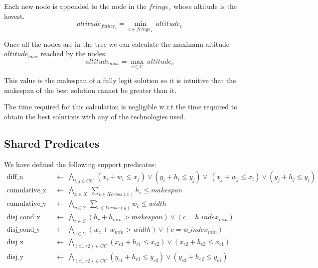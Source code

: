         Each new node is appended to the node in the \(fringe_z\) whose altitude is the lowest.
        \begin{equation*}
            altitude_{father_z} = \min_{c \in fringe_z}\ {altitude_c} 
        \end{equation*}

        Once all the nodes are in the tree we can calculate the maximum altitude $altitude_{max}$ reached by the nodes.
        \begin{equation*}
            altitude_{max} = \max_{c \in C}\  altitude_c
        \end{equation*}

        This value is the makespan of a fully legit solution so it is intuitive that the makespan of the best solution cannot
        be greater than it.
        
        The time required for this calculation is negligible w.r.t the time required to obtain the best solutions with any 
        of the technologies used.



\subsection{Shared Predicates} \label{sec:shared_predicates}
    We have defined the following support predicates:
    \begin{align}
              \text{diff\_n}\ &\ \leftarrow\ \bigwedge_{i,j \in CC}\ (x_i + w_i \leq x_j) \lor (y_i + h_i \leq y_j) \lor\ (x_j + w_j \leq x_i) \lor (y_j + h_j \leq y_i) \label{eq:diffn}        \\
        \text{cumulative\_x}\ &\ \leftarrow\ \bigwedge_{x \in X}\ \sum_{c \in Xcross(x)} h_c \leq makespan                                                               \label{eq:cumulative_x} \\
        \text{cumulative\_y}\ &\ \leftarrow\ \bigwedge_{y \in Y}\ \sum_{c \in Ycross(y)} w_c \leq width                                                                  \label{eq:cumulative_y} \\
        \text{disj\_cond\_x}\ &\ \leftarrow\ \bigwedge_{c \in C} (h_c + h_{min} > makespan) \lor (c = h\_index_{min})                                                    \nonumber \\
        \text{disj\_cond\_y}\ &\ \leftarrow\ \bigwedge_{c \in C} (w_c + w_{min} > width) \lor (c = w\_index_{min})                                                       \nonumber \\
              \text{disj\_x}\ &\ \leftarrow\ \bigwedge_{(c1,c2) \in CC} (x_{c1} + h_{c1} \leq x_{c2}) \lor (x_{c2} + h_{c2} \leq x_{c1})                                 \nonumber \\
              \text{disj\_y}\ &\ \leftarrow\ \bigwedge_{(c1,c2) \in CC} (y_{c1} + h_{c1} \leq y_{c2}) \lor (y_{c2} + h_{c2} \leq y_{c1})                                 \nonumber
    \end{align}



